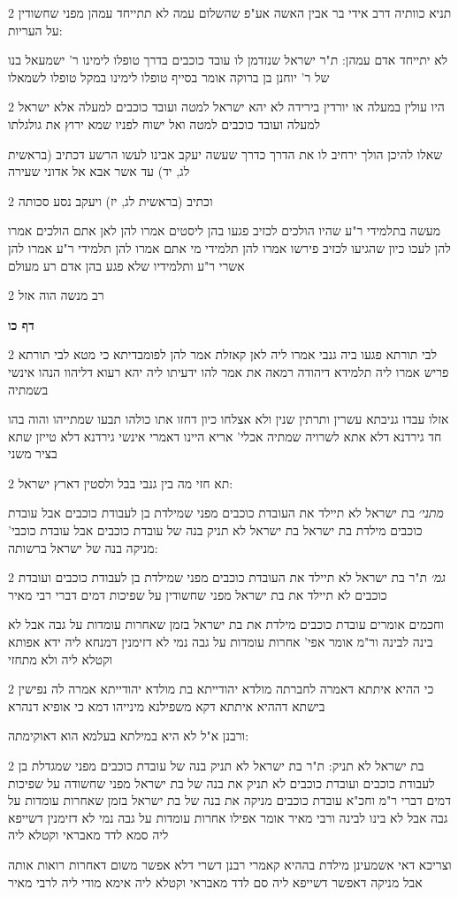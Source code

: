 \documentclass[12pt, openany]{book}
\newcommand{\sethebfont}{
\fontsize{10.5pt}{21.0pt} \selectfont
}
\newcommand{\twocol}[1]{
	{\sethebfont \begin{multicols}{2}
			#1
	\end{multicols}}	
}
\newcommand{\sectname}{}
\newcommand{\newsection}[1]{
	\addcontentsline{toc}{section}{#1}
	\renewcommand{\sectname}{#1}	
	\vspace{-\baselineskip}
	\begin{center}
		\textbf{%
\fontsize{16pt}{16pt}\selectfont
			#1}
	\end{center}
	\vspace{-\baselineskip}
	\nopagebreak
}
\begin{document}
\twocol{תניא כוותיה דרב אידי בר אבין האשה אע"פ שהשלום עמה לא תתייחד עמהן מפני שחשודין על העריות:
\par לא יתייחד אדם עמהן: ת"ר ישראל שנזדמן לו עובד כוכבים בדרך טופלו לימינו ר' ישמעאל בנו של ר' יוחנן בן ברוקה אומר בסייף טופלו לימינו במקל טופלו לשמאלו}
\twocol{היו עולין במעלה או יורדין בירידה לא יהא ישראל למטה ועובד כוכבים למעלה אלא ישראל למעלה ועובד כוכבים למטה ואל ישוח לפניו שמא ירוץ את גולגלתו
\par שאלו להיכן הולך ירחיב לו את הדרך כדרך שעשה יעקב אבינו לעשו הרשע דכתיב (בראשית לג, יד) עד אשר אבא אל אדוני שעירה}
\twocol{וכתיב (בראשית לג, יז) ויעקב נסע סכותה
\par מעשה בתלמידי ר"ע שהיו הולכים לכזיב פגעו בהן ליסטים אמרו להן לאן אתם הולכים אמרו להן לעכו כיון שהגיעו לכזיב פירשו אמרו להן תלמידי מי אתם אמרו להן תלמידי ר"ע אמרו להן אשרי ר"ע ותלמידיו שלא פגע בהן אדם רע מעולם}
\twocol{רב מנשה הוה אזל}
\newsection{דף כו}
\twocol{לבי תורתא פגעו ביה גנבי אמרו ליה לאן קאזלת אמר להן לפומבדיתא כי מטא לבי תורתא פריש אמרו ליה תלמידא דיהודה רמאה את אמר להו ידעיתו ליה יהא רעוא דליהוו הנהו אינשי בשמתיה
\par אזלו עבדו גניבתא עשרין ותרתין שנין ולא אצלחו כיון דחזו אתו כולהו תבעו שמתייהו והוה בהו חד גירדנא דלא אתא לשרויה שמתיה אכלי' אריא היינו דאמרי אינשי גירדנא דלא טייזן שתא בציר משני}
\twocol{תא חזי מה בין גנבי בבל ולסטין דארץ ישראל:
\par {\large\emph{מתני׳}} בת ישראל לא תיילד את העובדת כוכבים מפני שמילדת בן לעבודת כוכבים אבל עובדת כוכבים מילדת בת ישראל בת ישראל לא תניק בנה של עובדת כוכבים אבל עובדת כוכבי' מניקה בנה של ישראל ברשותה:}
\twocol{{\large\emph{גמ׳}} ת"ר בת ישראל לא תיילד את העובדת כוכבים מפני שמילדת בן לעבודת כוכבים ועובדת כוכבים לא תיילד את בת ישראל מפני שחשודין על שפיכות דמים דברי רבי מאיר
\par וחכמים אומרים עובדת כוכבים מילדת את בת ישראל בזמן שאחרות עומדות על גבה אבל לא בינה לבינה ור"מ אומר אפי' אחרות עומדות על גבה נמי לא דזימנין דמנחא ליה ידא אפותא וקטלא ליה ולא מתחזי}
\twocol{כי ההיא איתתא דאמרה לחברתה מולדא יהודייתא בת מולדא יהודייתא אמרה לה נפישין בישתא דההיא איתתא דקא משפילנא מינייהו דמא כי אופיא דנהרא
\par ורבנן א"ל לא היא במילתא בעלמא הוא דאוקימתה:}
\twocol{בת ישראל לא תניק: ת"ר בת ישראל לא תניק בנה של עובדת כוכבים מפני שמגדלת בן לעבודת כוכבים ועובדת כוכבים לא תניק את בנה של בת ישראל מפני שחשודה על שפיכות דמים דברי ר"מ וחכ"א עובדת כוכבים מניקה את בנה של בת ישראל בזמן שאחרות עומדות על גבה אבל לא בינו לבינה ורבי מאיר אומר אפילו אחרות עומדות על גבה נמי לא דזימנין דשייפא ליה סמא לדד מאבראי וקטלא ליה
\par וצריכא דאי אשמעינן מילדת בההיא קאמרי רבנן דשרי דלא אפשר משום דאחרות רואות אותה אבל מניקה דאפשר דשייפא ליה סם לדד מאבראי וקטלא ליה אימא מודי ליה לרבי מאיר}
\end{document}
